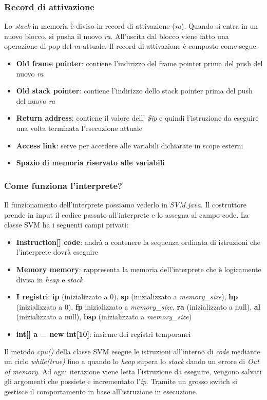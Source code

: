\documentclass[../../main]{subfiles}
\begin{document}
\subsubsection{Record di attivazione}
Lo \emph{stack} in memoria è diviso in record di attivazione (\emph{ra}). Quando si entra in un nuovo blocco, si pusha il nuovo \emph{ra}. All'uscita dal blocco viene fatto una operazione di pop del \emph{ra} attuale.
Il record di attivazione è composto come segue: 
\begin{itemize}
    \item \textbf{Old frame pointer}: contiene l'indirizzo del frame pointer prima del push del nuovo \emph{ra}
    \item \textbf{Old stack pointer}: contiene l'indirizzo dello stack pointer prima del push del nuovo \emph{ra}
    \item \textbf{Return address}: contiene il valore dell' \emph{\$ip} e quindi l'istruzione da eseguire una volta terminata l'esecuzione attuale
    \item \textbf{Access link}: serve per accedere alle variabili dichiarate in scope esterni
    \item \textbf{Spazio di memoria riservato alle variabili}
\end{itemize}

\subsubsection{Come funziona l'interprete?}
Il funzionamento dell'interprete possiamo vederlo in \emph{SVM.java}. Il costruttore prende in input il codice passato all'interprete e lo assegna al campo code.
La classe SVM ha i seguenti campi privati:
\begin{itemize}
    \item \textbf{Instruction[] code}: andrà a contenere la sequenza ordinata di istruzioni che l'interprete dovrà eseguire
    \item \textbf{Memory memory}: rappresenta la memoria dell'interprete che è logicamente divisa in \emph{heap} e \emph{stack}
    \item \textbf{I registri}: \textbf{ip} (inizializzato a 0), \textbf{sp} (inizializzato a \emph{memory\_size}), \textbf{hp} (inizializzato a 0), \textbf{fp} inizializzato a \emph{memory\_size}, \textbf{ra} (inizializzato a null), \textbf{al} (inizializzato a null), \textbf{bsp} (inizializzato a \emph{memory\_size}) 
    \item \textbf{int[] a = new int[10]}: insieme dei registri temporanei
\end{itemize}
Il metodo \emph{cpu()} della classe SVM esegue le istruzioni all'interno di \emph{code} mediante un ciclo \emph{while(true)} fino a quando lo \emph{heap} supera lo \emph{stack} dando un errore di \emph{Out of memory}.
Ad ogni iterazione viene letta l'istruzione da eseguire, vengono salvati gli argomenti che possiete e incrementato l'\emph{ip}. Tramite un grosso switch si gestisce il comportamento in base all'istruzione in esecuzione. 
\end{document}
